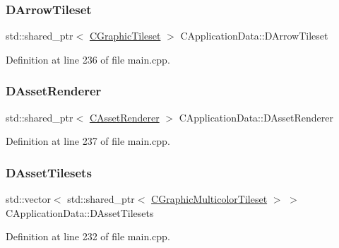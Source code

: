 \subsubsection{\texorpdfstring{D\+Arrow\+Tileset}{DArrowTileset}}
{\footnotesize\ttfamily std\+::shared\+\_\+ptr$<$ \hyperlink{classCGraphicTileset}{C\+Graphic\+Tileset} $>$ C\+Application\+Data\+::\+D\+Arrow\+Tileset\hspace{0.3cm}{\ttfamily [protected]}}



Definition at line 236 of file main.\+cpp.

\hypertarget{classCApplicationData_a5b42401441ae3a70fb4bd26f5dfdba01}{}\label{classCApplicationData_a5b42401441ae3a70fb4bd26f5dfdba01} 
\subsubsection{\texorpdfstring{D\+Asset\+Renderer}{DAssetRenderer}}
{\footnotesize\ttfamily std\+::shared\+\_\+ptr$<$ \hyperlink{classCAssetRenderer}{C\+Asset\+Renderer} $>$ C\+Application\+Data\+::\+D\+Asset\+Renderer\hspace{0.3cm}{\ttfamily [protected]}}



Definition at line 237 of file main.\+cpp.

\hypertarget{classCApplicationData_a1aaf56a300b30c5e2484a5359366d77a}{}\label{classCApplicationData_a1aaf56a300b30c5e2484a5359366d77a} 
\subsubsection{\texorpdfstring{D\+Asset\+Tilesets}{DAssetTilesets}}
{\footnotesize\ttfamily std\+::vector$<$ std\+::shared\+\_\+ptr$<$ \hyperlink{classCGraphicMulticolorTileset}{C\+Graphic\+Multicolor\+Tileset} $>$ $>$ C\+Application\+Data\+::\+D\+Asset\+Tilesets\hspace{0.3cm}{\ttfamily [protected]}}



Definition at line 232 of file main.\+cpp.

\hypertarget{classCApplicationData_a93e478c5552a527fe2d680cac8fc910d}{}\label{classCApplicationData_a93e478c5552a527fe2d680cac8fc910d} 
